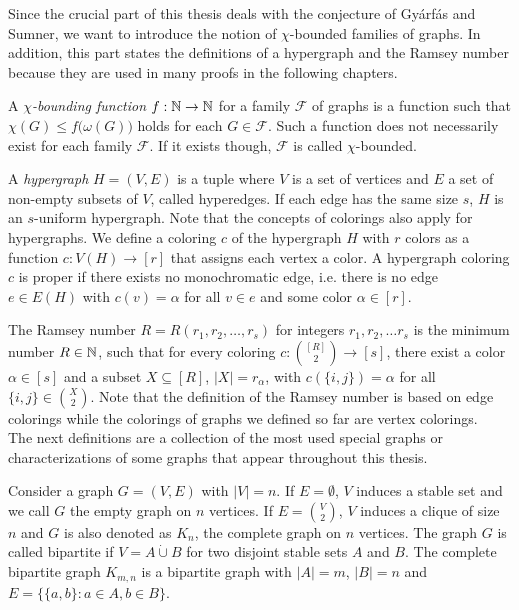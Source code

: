 Since the crucial part of this thesis deals with the conjecture of Gyárfás and Sumner, we want to introduce the notion of $\chi$-bounded families of graphs. In addition, this part states the definitions of a hypergraph and the Ramsey number because they are used in many proofs in the following chapters.

\begin{defn}\label{d1}
A $\chi$\textit{-bounding function} $f:\mathbb{N}\to\mathbb{N}$ for a family $\mathcal{F}$ of graphs is a function such that $\chi (G)\leq f\big(\omega (G)\big)$ holds for each $G\in\mathcal{F}$. Such a function does not necessarily exist for each family $\mathcal{F}$. If it exists though, $\mathcal{F}$ is called $\chi$-bounded. 
\end{defn}

A \textit{hypergraph} $H=(V,E)$ is a tuple where $V$ is a set of vertices and $E$ a set of non-empty subsets of $V$, called hyperedges. If each edge has the same size $s$, $H$ is an $s$-uniform hypergraph. Note that the concepts of colorings also apply for hypergraphs. We define a coloring $c$ of the hypergraph $H$ with $r$ colors as a function $c:V(H)\to [r]$ that assigns each vertex a color. A hypergraph coloring $c$ is proper if there exists no monochromatic edge, i.e. there is no edge $e\in E(H)$ with $c(v)=\alpha$ for all $v\in e$ and some color $\alpha\in [r]$.

The Ramsey number $R=R(r_1, r_2, \dots ,r_s)$ for integers $r_1, r_2, \dots r_s$ is the minimum number $R\in\mathbb{N}$, such that for every coloring $c:{[R]\choose 2}\to [s]$, there exist a color $\alpha\in [s]$ and a subset $X\subseteq [R]$, $\vert X\vert =r_{\alpha}$, with $c(\lbrace i,j\rbrace )=\alpha$ for all $\lbrace i,j\rbrace\in {X\choose 2}$. Note that the definition of the Ramsey number is based on edge colorings while the colorings of graphs we defined so far are vertex colorings.\\

The next definitions are a collection of the most used special graphs or characterizations of some graphs that appear throughout this thesis.

Consider a graph $G=(V,E)$ with $\vert V\vert = n$. If $E=\emptyset$, $V$ induces a stable set and we call $G$ the empty graph on $n$ vertices. If $E= {V\choose{2}}$, $V$ induces a clique of size $n$ and $G$ is also denoted as $K_n$, the complete graph on $n$ vertices. The graph $G$ is called bipartite if $V=A\dot{\cup} B$ for two disjoint stable sets $A$ and $B$. The complete bipartite graph $K_{m,n}$ is a bipartite graph with $\vert A\vert =m$, $\vert B\vert =n$ and $E=\lbrace \lbrace a,b\rbrace :a\in A,b\in B\rbrace$.

